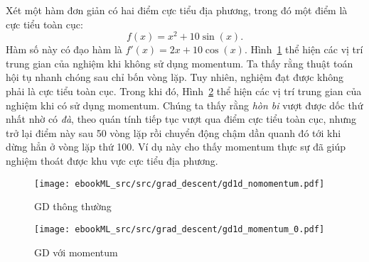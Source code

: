 Xét một hàm đơn giản có hai
điểm cực tiểu địa phương, trong đó một điểm là cực tiểu toàn cục:
\begin{equation}
f(x) = x^2 + 10\sin(x).
\end{equation}
Hàm số này có đạo hàm là $f'(x) = 2x + 10\cos(x)$. Hình~\ref{fig:8_nomomen} thể
hiện các vị trí trung gian của nghiệm khi không sử dụng momentum. Ta thấy rằng
thuật toán hội tụ nhanh chóng sau chỉ bốn vòng lặp. Tuy nhiên, nghiệm đạt được
không phải là cực tiểu toàn cục. Trong khi đó, Hình~\ref{fig:8_momen} thể hiện các
vị trí trung gian của nghiệm khi có sử dụng momentum. Chúng ta thấy rằng
\textit{hòn bi} vượt được dốc thứ nhất nhờ có \textit{đà}, theo quán tính tiếp
tục vượt qua điểm cực tiểu toàn cục, nhưng trở lại điểm này sau 50 vòng lặp
rồi chuyển động chậm dần quanh đó tới khi dừng hẳn ở vòng lặp thứ 100. Ví dụ này
cho thấy momentum thực sự đã giúp nghiệm thoát được khu vực cực tiểu địa phương.

\begin{figure}[t]
\centering
\texttt{[image: ebookML\_src/src/grad\_descent/gd1d\_nomomentum.pdf]}
\caption[]{GD thông thường}
\label{fig:8_nomomen}
\end{figure}

\begin{figure}[t]
\centering
\texttt{[image: ebookML\_src/src/grad\_descent/gd1d\_momentum\_0.pdf]}
\caption[]{GD với momentum}
\label{fig:8_momen}
\end{figure}




